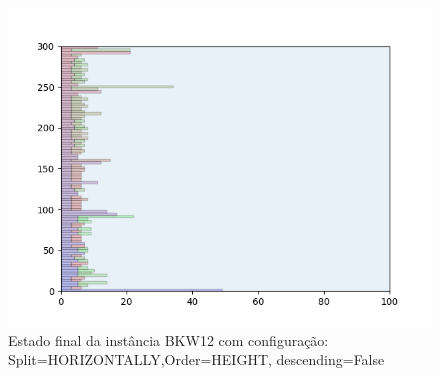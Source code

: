 \begin{figure}[H]
    \centering
    \caption[]{Estado final da instância BKW12 com configuração: Split=HORIZONTALLY,Order=HEIGHT, descending=False}
    \label{fig:bkw12-horizontally-height-false}
    \includegraphics[scale=0.5]{output/figures/bkw/bkw12/horizontally/height/false/000}
\end{figure}